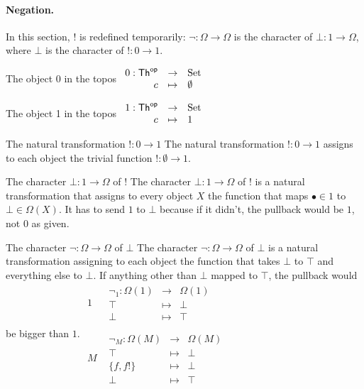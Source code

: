 \paragraph{Negation.}
In this section, $!$ is redefined temporarily: $\neg\colon\Omega \to \Omega$ is the character of $\bot\colon 1\to \Omega$, where $\bot$ is the character of $!\colon 0 \to 1$.

\begin{remark} The object 0 in the topos
  $\begin{array}{rcl}0:\mathsf{Th}^{\mathsf{op}} &\to& {\rm Set}\\c & \mapsto & \emptyset\end{array}$
\end{remark}

\begin{remark}
The object 1 in the topos
  $\begin{array}{rcl}1:\mathsf{Th}^{\mathsf{op}} &\to& {\rm Set}\\c & \mapsto & 1\end{array}$
\end{remark}

\begin{remark}
The natural transformation $!\colon 0\to 1$
  The natural transformation $!\colon 0\to 1$ assigns to each object the trivial function $!\colon \emptyset \to 1$.
\end{remark}  

\begin{remark}
The character $\bot\colon 1 \to \Omega$ of $!$
  The character $\bot\colon 1 \to \Omega$ of $!$ is a natural transformation that assigns to every object $X$ the function that maps $\bullet \in 1$ to $\bot \in \Omega(X)$.  It has to send $1$ to $\bot$ because if it didn't, the pullback would be $1$, not $0$ as given.
\end{remark}

\begin{remark}
The character $\neg\colon \Omega \to \Omega$ of $\bot$
The character $\neg\colon \Omega \to \Omega$ of $\bot$ is a natural transformation assigning to each object the function that takes $\bot$ to $\top$ and everything else to $\bot$. If anything other than $\bot$ mapped to $\top$, the pullback would be bigger than $1$.
$\begin{array}{cc}1&\begin{array}{rcl}\neg_1\colon\Omega(1)&\to&\Omega(1)\\ \top &\mapsto &\bot\\ \bot &\mapsto & \top\end{array}\\\\ M & \begin{array}{rcl}\neg_M\colon\Omega(M)&\to&\Omega(M)\\\top & \mapsto & \bot \\ \{f,f!\} & \mapsto & \bot \\\bot & \mapsto & \top\end{array}\end{array}$
\end{remark}

